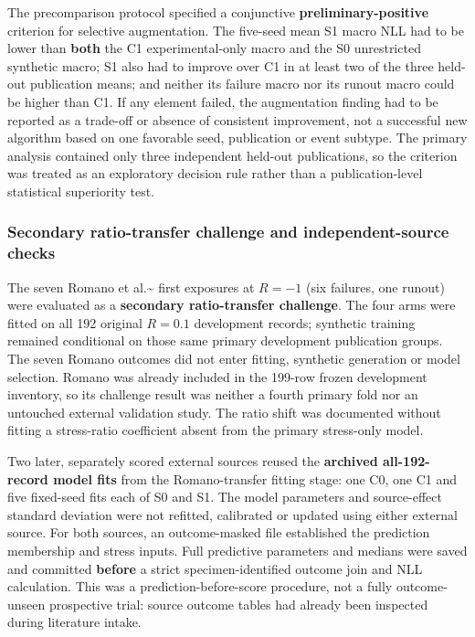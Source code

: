 \documentclass[12pt,a4paper]{article}
\begin{document}
The precomparison protocol specified a conjunctive \textbf{preliminary-positive} criterion for selective augmentation. The five-seed mean S1 macro NLL had to be lower than \textbf{both} the C1 experimental-only macro and the S0 unrestricted synthetic macro; S1 also had to improve over C1 in at least two of the three held-out publication means; and neither its failure macro nor its runout macro could be higher than C1. If any element failed, the augmentation finding had to be reported as a trade-off or absence of consistent improvement, not a successful new algorithm based on one favorable seed, publication or event subtype. The primary analysis contained only three independent held-out publications, so the criterion was treated as an exploratory decision rule rather than a publication-level statistical superiority test.

\subsubsection{Secondary ratio-transfer challenge and independent-source checks}

The seven Romano et al.\textasciitilde{}\cite{romano2018} first exposures at \(R=-1\) (six failures, one runout) were evaluated as a \textbf{secondary ratio-transfer challenge}. The four arms were fitted on all 192 original \(R=0.1\) development records; synthetic training remained conditional on those same primary development publication groups. The seven Romano outcomes did not enter fitting, synthetic generation or model selection. Romano was already included in the 199-row frozen development inventory, so its challenge result was neither a fourth primary fold nor an untouched external validation study. The ratio shift was documented without fitting a stress-ratio coefficient absent from the primary stress-only model.

Two later, separately scored external sources reused the \textbf{archived all-192-record model fits} from the Romano-transfer fitting stage: one C0, one C1 and five fixed-seed fits each of S0 and S1. The model parameters and source-effect standard deviation were not refitted, calibrated or updated using either external source. For both sources, an outcome-masked file established the prediction membership and stress inputs. Full predictive parameters and medians were saved and committed \textbf{before} a strict specimen-identified outcome join and NLL calculation. This was a prediction-before-score procedure, not a fully outcome-unseen prospective trial: source outcome tables had already been inspected during literature intake.
\end{document}
